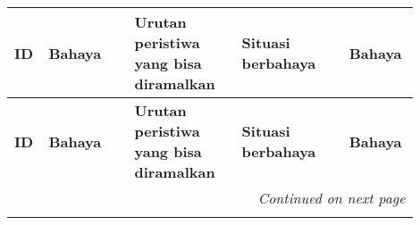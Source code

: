 \documentclass[11pt,a4paper,twoside,onecolumn]{book}
\begin{document}
			\begin{longtable}{p{0.05\linewidth} p{0.20\linewidth} p{0.25\linewidth} p{0.25\linewidth} p{0.15\linewidth}}
				\hline
				\cellcolor{yellow} \textbf{ID} & \cellcolor{yellow} \textbf{Bahaya} & \cellcolor{yellow} \textbf{Urutan peristiwa yang bisa diramalkan} & \cellcolor{yellow} \textbf{Situasi berbahaya} & \cellcolor{yellow} \textbf{Bahaya} \\
				\hline
				\endfirsthead
				\hline
				\cellcolor{yellow} \textbf{ID} & \cellcolor{yellow} \textbf{Bahaya} & \cellcolor{yellow} \textbf{Urutan peristiwa yang bisa diramalkan} & \cellcolor{yellow} \textbf{Situasi berbahaya} & \cellcolor{yellow} \textbf{Bahaya} \\
				\hline
				\endhead
				\hline
				\multicolumn{5}{r}{\textit{Continued on next page}} \\
				\endfoot
				\hline
				\endlastfoot
				

\end{longtable}
\end{document}
